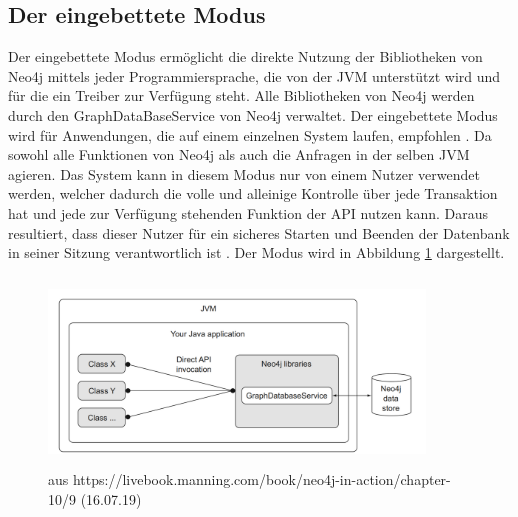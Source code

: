 \subsection{Der eingebettete Modus}
Der eingebettete Modus ermöglicht die direkte Nutzung der  Bibliotheken von Neo4j mittels jeder Programmiersprache, die von der JVM unterstützt wird und für die ein Treiber zur Verfügung steht. Alle Bibliotheken von Neo4j werden durch den GraphDataBaseService von Neo4j verwaltet. Der eingebettete Modus wird für Anwendungen, die auf einem einzelnen System laufen, empfohlen \parencite{raj2015neo4j}. Da sowohl alle Funktionen von Neo4j als auch die Anfragen in der selben JVM agieren. Das System kann in diesem Modus nur von einem Nutzer verwendet werden, welcher dadurch die volle und alleinige Kontrolle über jede Transaktion hat und  jede zur Verfügung stehenden Funktion der API nutzen kann. Daraus resultiert, dass dieser Nutzer für ein sicheres Starten und Beenden der Datenbank in seiner Sitzung verantwortlich ist \parencite{robinson2013graph}. Der Modus wird in Abbildung \ref{fig:Embedded} dargestellt.
\FloatBarrier
\begin{figure}[!htb]
	\centering	
	\includegraphics [width=10cm, height=5cm]{Figures/embedded}
	\caption[Eingebetteter Modus]{aus https://livebook.manning.com/book/neo4j-in-action/chapter-10/9 (16.07.19)}
	\label{fig:Embedded}
\end{figure}
\FloatBarrier
